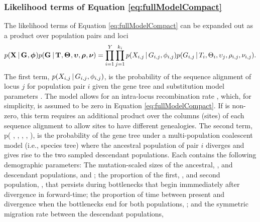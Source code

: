 \documentclass[letterpaper,12pt]{article}
\begin{document}
\begin{linenumbers}
\subsubsection*{Likelihood terms of Equation \ref{eq:fullModelCompact}}
\begin{linenomath}
The likelihood terms of Equation \ref{eq:fullModelCompact} can
be expanded out as a product over population pairs and loci
\begin{equation}
    p(\alignmentVector \given \geneTreeVector, \hkyModelVector)
    p(\geneTreeVector \given \divTimeMapVector, \demographicParamVector,
    \locusMutationRateScalarVector, \ploidyScalarVector,
    \mutationRateScalarConstantVector) = 
    \prod_{i=1}^{\npairs{}}
    \prod_{j=1}^{\nloci{i}}
    p(\alignment{i}{j} \given \geneTree{i}{j}, \hkyModel{i}{j})
    p(\geneTree{i}{j} \given \divTimeMap{i}, \demographicParams{i},
    \locusMutationRateScalar{j}, \ploidyScalar{i}{j},
    \mutationRateScalarConstant{i}{j}).
    \label{eq:modelLikelihoodExpanded}
\end{equation}
The first term,
$p(\alignment{i}{j} \given \geneTree{i}{j}, \hkyModel{i}{j})$,
is the probability of the sequence alignment of locus $j$ for population pair
$i$ given the gene tree and \hky substitution model parameters \citep[i.e., the
``Felsenstein likelhood'';][]{Felsenstein1981}.
The model allows for an intra-locus recombination rate \recombinationRate,
which, for simplicity, is assumed to be zero in Equation
\ref{eq:fullModelCompact}.
If \recombinationRate is non-zero, this term requires an additional product
over the columns (sites) of each sequence alignment to allow sites to have
different genealogies.
The second term,
p( \given {}, ,
, ,
),
is the probability of the gene tree under a multi-population coalescent model
(i.e., species tree) where the ancestral population of pair $i$ diverges
and gives rise to the two sampled descendant populations.
Each \demographicParams contains the following demographic parameters:
The mutation-scaled sizes of the ancestral, \ancestralTheta{}, and descendant
populations,  and ;
the proportion of the first, , and second population,
, that persists during bottlenecks that begin immmediately
after divergence in forward-time;
the proportion of time between present and divergence when the bottlenecks
end for both populations, \bottleTime{};
and the symmetric migration rate between the descendant populations,

\end{linenomath}
\end{linenumbers}
\end{document}
